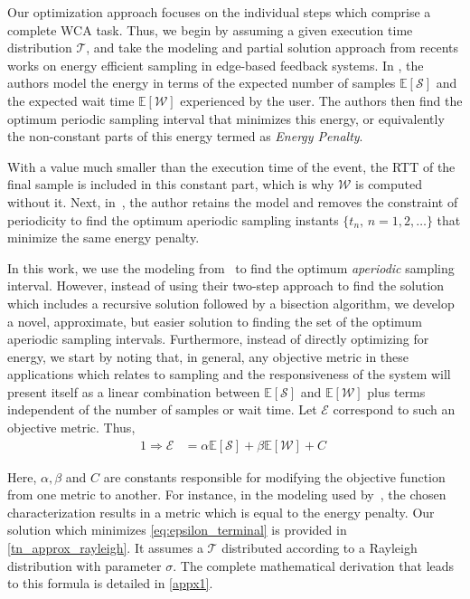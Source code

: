 Our optimization approach focuses on the individual steps which comprise a complete \gls{WCA} task.
Thus, we begin by assuming a given execution time distribution \( \mathcal{T} \), and take the modeling and partial solution approach from recents works on energy efficient sampling in edge-based feedback systems.
In \textcite{moothedath2021energy,moothedath2022energy1}, the authors model the energy in terms of the expected number of samples $\mathbb{E}[\mathcal{S}]$ and the expected wait time $\mathbb{E}[\mathcal{W}]$ experienced by the user.
The authors then find the optimum periodic sampling interval that minimizes this energy, or equivalently the non-constant parts of this energy termed as \textit{Energy Penalty}.

With a value much smaller than the execution time of the event, the \gls{RTT} of the final sample is included in this constant part, which is why $\mathcal{W}$ is computed without it.
Next, in~\cite{moothedath2022energy2}, the author retains the model and removes the constraint of periodicity to find the optimum aperiodic sampling instants $\{t_n,\,n=1,2,\dots\}$ that minimize the same energy penalty.

In this work, we use the modeling from~\cite{moothedath2022energy2} to find the optimum \emph{aperiodic} sampling interval.
However, instead of using their two-step approach to find the solution which includes a recursive solution followed by a bisection algorithm, we develop a novel, approximate, but easier solution to finding the set of the optimum aperiodic sampling intervals.
Furthermore, instead of directly optimizing for energy, we start by noting that, in general, any objective metric in these applications which relates to sampling and the responsiveness of the system will present itself
as a linear combination between $\mathbb{E}[\mathcal{S}]$ and $\mathbb{E}[\mathcal{W}]$ plus terms independent of the number of samples or wait time.
Let $\mathcal{E}$ correspond to such an objective metric.
Thus, 
\begin{alignat}{1}
    \Rightarrow\mathcal{E}&=\alpha\mathbb{E}[\mathcal{S}]+\beta\mathbb{E}[\mathcal{W}]+C\;\label{eq:epsilon_terminal}
\end{alignat}

Here, $\alpha, \beta$ and $C$ are constants responsible for modifying the objective function from one metric to another.
For instance, in the modeling used by~\cite{moothedath2021energy,moothedath2022energy1,moothedath2022energy2}, the chosen characterization results in a metric which is equal to the energy penalty.
Our solution which minimizes \cref{eq:epsilon_terminal} is provided in \cref{tn_approx_rayleigh}.
It assumes a $\mathcal{T}$ distributed according to a Rayleigh distribution with parameter $\sigma$.
The complete mathematical derivation that leads to this formula is detailed in \cref{appx1}.

